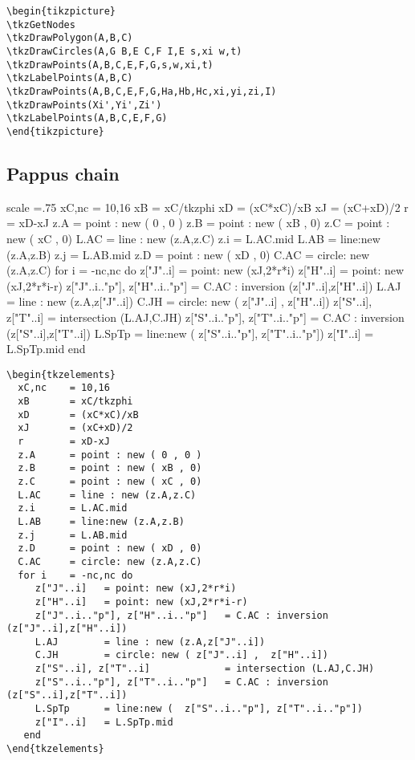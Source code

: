 \begin{Verbatim}
\begin{tikzpicture}
\tkzGetNodes
\tkzDrawPolygon(A,B,C)
\tkzDrawCircles(A,G B,E C,F I,E s,xi w,t)
\tkzDrawPoints(A,B,C,E,F,G,s,w,xi,t)
\tkzLabelPoints(A,B,C)
\tkzDrawPoints(A,B,C,E,F,G,Ha,Hb,Hc,xi,yi,zi,I)
\tkzDrawPoints(Xi',Yi',Zi')
\tkzLabelPoints(A,B,C,E,F,G)
\end{tikzpicture}
\end{Verbatim}

\subsection{Pappus chain} %
\label{sub:pappus_chain}

\begin{tkzelements}
  scale =.75
   xC,nc    = 10,16
   xB       = xC/tkzphi
   xD       = (xC*xC)/xB
   xJ       = (xC+xD)/2
   r        = xD-xJ
   z.A      = point : new ( 0 , 0 )
   z.B      = point : new ( xB , 0)
   z.C      = point : new ( xC , 0)
   L.AC     = line : new (z.A,z.C)
   z.i      = L.AC.mid
   L.AB     = line:new (z.A,z.B)
   z.j      = L.AB.mid
   z.D      = point : new ( xD , 0)
   C.AC     = circle: new (z.A,z.C)
   for i    = -nc,nc do
      z["J"..i]   = point: new (xJ,2*r*i)
      z["H"..i]   = point: new (xJ,2*r*i-r)
      z["J"..i.."p"], z["H"..i.."p"]   = C.AC : inversion (z["J"..i],z["H"..i])
      L.AJ        = line : new (z.A,z["J"..i])
      C.JH        = circle: new ( z["J"..i] ,  z["H"..i])
      z["S"..i], z["T"..i]             = intersection (L.AJ,C.JH)
      z["S"..i.."p"], z["T"..i.."p"]   = C.AC : inversion (z["S"..i],z["T"..i])
      L.SpTp      = line:new (  z["S"..i.."p"], z["T"..i.."p"])
      z["I"..i]   = L.SpTp.mid
    end
\end{tkzelements}

\begin{Verbatim}
\begin{tkzelements}
  xC,nc    = 10,16
  xB       = xC/tkzphi
  xD       = (xC*xC)/xB
  xJ       = (xC+xD)/2
  r        = xD-xJ
  z.A      = point : new ( 0 , 0 )
  z.B      = point : new ( xB , 0)
  z.C      = point : new ( xC , 0)
  L.AC     = line : new (z.A,z.C)
  z.i      = L.AC.mid
  L.AB     = line:new (z.A,z.B)
  z.j      = L.AB.mid
  z.D      = point : new ( xD , 0)
  C.AC     = circle: new (z.A,z.C)
  for i    = -nc,nc do
     z["J"..i]   = point: new (xJ,2*r*i)
     z["H"..i]   = point: new (xJ,2*r*i-r)
     z["J"..i.."p"], z["H"..i.."p"]   = C.AC : inversion (z["J"..i],z["H"..i])
     L.AJ        = line : new (z.A,z["J"..i])
     C.JH        = circle: new ( z["J"..i] ,  z["H"..i])
     z["S"..i], z["T"..i]             = intersection (L.AJ,C.JH)
     z["S"..i.."p"], z["T"..i.."p"]   = C.AC : inversion (z["S"..i],z["T"..i])
     L.SpTp      = line:new (  z["S"..i.."p"], z["T"..i.."p"])
     z["I"..i]   = L.SpTp.mid
   end
\end{tkzelements}
\end{Verbatim}

